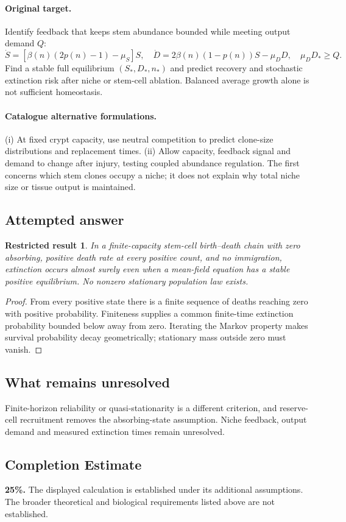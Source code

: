 \documentclass[11pt]{article}
\newtheorem{attemptresult}{Restricted result}[section]
\begin{document}
\paragraph{Original target.}
Identify feedback that keeps stem abundance bounded while meeting output demand $Q$:
\[
\dot S=[\beta(n)(2p(n)-1)-\mu_S]S,\quad
\dot D=2\beta(n)(1-p(n))S-\mu_DD,
\quad\mu_DD_*\geq Q.
\]
Find a stable full equilibrium $(S_*,D_*,n_*)$ and predict recovery and stochastic extinction risk after niche or stem-cell ablation. Balanced average growth alone is not sufficient homeostasis.
\paragraph{Catalogue alternative formulations.}
(i) At fixed crypt capacity, use neutral competition to predict clone-size distributions and replacement times. (ii) Allow capacity, feedback signal and demand to change after injury, testing coupled abundance regulation. The first concerns which stem clones occupy a niche; it does not explain why total niche size or tissue output is maintained.
\subsection{Attempted answer}
\begin{attemptresult}
In a finite-capacity stem-cell birth--death chain with zero absorbing, positive death rate at every positive count, and no immigration, extinction occurs almost surely even when a mean-field equation has a stable positive equilibrium. No nonzero stationary population law exists.
\end{attemptresult}
\begin{proof}
From every positive state there is a finite sequence of deaths reaching zero with positive probability. Finiteness supplies a common finite-time extinction probability bounded below away from zero. Iterating the Markov property makes survival probability decay geometrically; stationary mass outside zero must vanish.
\end{proof}
\subsection{What remains unresolved}
Finite-horizon reliability or quasi-stationarity is a different criterion, and reserve-cell recruitment removes the absorbing-state assumption. Niche feedback, output demand and measured extinction times remain unresolved.
\subsection{Completion Estimate}
\textbf{25\%.} The displayed calculation is established under its additional assumptions. The broader theoretical and biological requirements listed above are not established.
\end{document}
